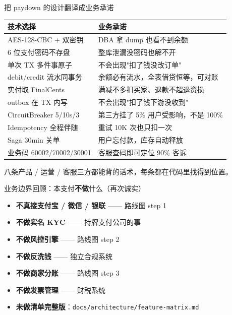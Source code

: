 \documentclass[aspectratio=169,11pt]{beamer}
\begin{document}
\begin{frame}[shrink]{把 paydown 的设计翻译成业务承诺}
\begin{tabular}{@{}ll@{}}
\toprule
技术选择                  & 业务承诺                            \\
\midrule
AES-128-CBC + 双密钥      & DBA 拿 dump 也看不到余额            \\
6 位支付密码不存盘        & 整库泄漏没密码也解不开              \\
单次 TX 多件事原子        & 不会出现"扣了钱没改订单"            \\
debit/credit 流水同事务   & 余额必有流水，全表借贷恒等，可对账   \\
实付取 FinalCents         & 满减不多扣买家、退款不超退资损       \\
outbox 在 TX 内写         & 不会出现"扣了钱下游没收到"          \\
CircuitBreaker 5/10s/3   & 第三方挂了 5\% 用户受影响，不是 100\% \\
Idempotency 全程伴随     & 重试 10K 次也只扣一次               \\
Saga 30min 关单           & 用户忘付款，库存自动释放              \\
业务码 60002/70002/30001  & 客服查码即可定位 90\% 客诉            \\
\bottomrule
\end{tabular}
\vspace{1mm}
\small 八条产品 / 运营 / 客服三方都能背的话术，每条都在代码里找得到位置。
\end{frame}

\begin{frame}[shrink]{业务边界回顾：本支付\textbf{不做}什么（再次诚实）}
\begin{itemize}
  \item \textbf{不真接支付宝 / 微信 / 银联} —— 路线图 step 1
  \item \textbf{不做实名 KYC} —— 持牌支付公司的事
  \item \textbf{不做风控引擎} —— 路线图 step 2
  \item \textbf{不做反洗钱} —— 独立合规系统
  \item \textbf{不做商家分账} —— 路线图 step 3
  \item \textbf{不做发票管理} —— 财税系统
  \item \textbf{未做清单完整版}：\texttt{docs/architecture/feature-matrix.md}
\end{itemize}
\end{frame}
\end{document}

